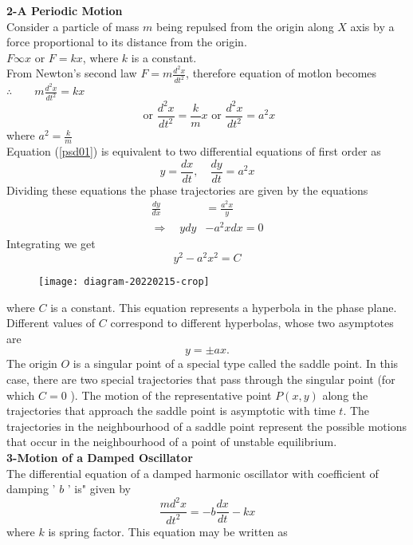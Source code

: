 \textbf{2-A Periodic Motion}\\
Consider a particle of mass $m$ being repulsed from the origin along $X$ axis by a force proportional to its distance from the origin.\\
$F \infty x$ or $F=k x$, where $k$ is a constant.\\
From Newton's second law $F=m \frac{d^{2} x}{d t^{2}}$, therefore equation of motlon becomes\\
$\therefore \qquad m \frac{d^{2} x}{d t^{2}}=k x $\\
\begin{equation}
\text { or }  \frac{d^{2} x}{d t^{2}}=\frac{k}{m} x \text { or } \frac{d^{2} x}{d t^{2}}=a^{2} x\label{psd01}
\end{equation}
where \qquad
$a^{2}=\frac{k}{m}$\\
Equation (\ref{psd01}) is equivalent to two differential equations of first order as
$$
y=\frac{d x}{d t}, \quad \frac{d y}{d t}=a^{2} x
$$
Dividing these equations the phase trajectories are given by the equations
$$
\begin{aligned}
\frac{d y}{d x} &=\frac{a^{2} x}{y} \\
\Rightarrow \quad y d y &-a^{2} x d x=0
\end{aligned}
$$
Integrating we get
\begin{equation}
y^{2}-a^{2} x^{2}=C
\end{equation}
\begin{figure}[H]
	\centering
	\texttt{[image: diagram-20220215-crop]}
\end{figure}
where $C$ is a constant. This equation represents a hyperbola in the phase plane. Different values of $C$ correspond to different hyperbolas, whose two asymptotes are
$$
y=\pm a x .
$$
The origin $O$ is a singular point of a special type called the saddle point. In this case, there are two special trajectories that pass through the singular point (for which $C=0$ ). The motion of the representative point $P(x, y)$ along the trajectories that approach the saddle point is asymptotic with time $t$. The trajectories in the neighbourhood of a saddle point represent the possible motions that occur in the neighbourhood of a point of unstable equilibrium.\\
\textbf{3-Motion of a Damped Oscillator}\\
The differential equation of a damped harmonic oscillator with coefficient of damping ' $b$ ' is" given by
$$
\frac{m d^{2} x}{d t^{2}}=-b \frac{d x}{d t}-k x
$$
where $k$ is spring factor. This equation may be written as
